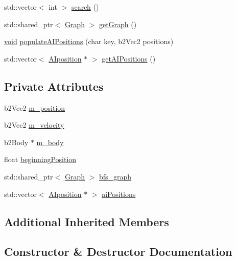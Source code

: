 \begin{DoxyCompactItemize}
\item 
std\+::vector$<$ int $>$ \hyperlink{classAIComponent_a81d6ead52253301578f5e25527075899}{search} ()
\item 
std\+::shared\+\_\+ptr$<$ \hyperlink{classGraph}{Graph} $>$ \hyperlink{classAIComponent_aeddece3b6c4aac54c401fb3ebeb657ba}{get\+Graph} ()
\item 
\hyperlink{imgui__impl__opengl3__loader_8h_ac668e7cffd9e2e9cfee428b9b2f34fa7}{void} \hyperlink{classAIComponent_a33f4903d01350f4c17e6275dbf3f9097}{populate\+A\+I\+Positions} (char key, b2\+Vec2 positions)
\item 
std\+::vector$<$ \hyperlink{structAIposition}{A\+Iposition} $\ast$ $>$ \hyperlink{classAIComponent_a8bc910076abb3723183b92fa8d317049}{get\+A\+I\+Positions} ()
\end{DoxyCompactItemize}
\subsection*{Private Attributes}
\begin{DoxyCompactItemize}
\item 
b2\+Vec2 \hyperlink{classAIComponent_a4762eb8f3fc7c56cbedef2074183a7df}{m\+\_\+position}
\item 
b2\+Vec2 \hyperlink{classAIComponent_abdffe34d98dd34e51c777512bce686ca}{m\+\_\+velocity}
\item 
b2\+Body $\ast$ \hyperlink{classAIComponent_a5ae9cb55df68289dc80568e0072b2473}{m\+\_\+body}
\item 
float \hyperlink{classAIComponent_aa0d6c295cf92653b96bad859e0fa330f}{beginning\+Position}
\item 
std\+::shared\+\_\+ptr$<$ \hyperlink{classGraph}{Graph} $>$ \hyperlink{classAIComponent_a7b0b2a7230a851322867a387a81f985a}{bfs\+\_\+graph}
\item 
std\+::vector$<$ \hyperlink{structAIposition}{A\+Iposition} $\ast$ $>$ \hyperlink{classAIComponent_a016b40f3b9d332294a517cbcc28ddcc9}{ai\+Positions}
\end{DoxyCompactItemize}
\subsection*{Additional Inherited Members}


\subsection{Constructor \& Destructor Documentation}
\mbox{\label{classAIComponent_a78108337893807f59557596e2825cbb3}} 
